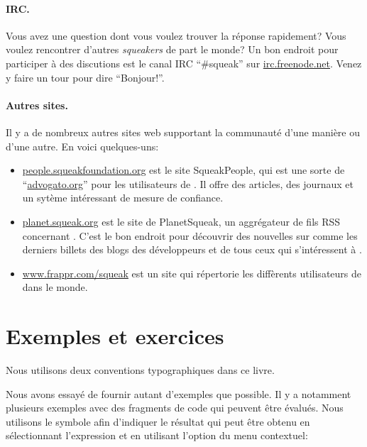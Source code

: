 \documentclass[a4paper,10pt,twoside]{book}
\begin{document}
\paragraph{IRC.}
Vous avez une question dont vous voulez trouver la r\'eponse
rapidement? Vous voulez rencontrer d'autres \emph{squeakers} de part
le monde? Un bon endroit pour participer \`a des discutions est le
canal IRC ``\#squeak'' sur \url{irc.freenode.net}. 
Venez y faire un tour pour dire ``Bonjour!''.

\paragraph{Autres sites.} Il y a de nombreux autres sites web supportant la communaut\'e \sq d'une mani\`ere ou d'une autre. En voici quelques-uns:
\begin{itemize}
  \item \url{people.squeakfoundation.org} est le site
    \textsf{SqueakPeople}, qui est une sorte de
    ``\url{advogato.org}'' pour les utilisateurs de \sq. Il offre des
    articles, des journaux et un syt\`eme int\'eressant de mesure de confiance.

  \item \url{planet.squeak.org} est le site de \textsf{PlanetSqueak},
    un aggr\'egateur de fils RSS concernant \sq. C'est le bon endroit
    pour d\'ecouvrir des nouvelles sur \sq comme les derniers billets
    des blogs des d\'eveloppeurs et de tous ceux qui s'int\'eressent \`a \sq.

  \item \url{www.frappr.com/squeak} est un site qui r\'epertorie les
    diff\`erents utilisateurs de \sq dans le monde.

\end{itemize}


\section*{Exemples et exercices}

Nous utilisons deux conventions typographiques dans ce livre.

Nous avons essay\'e de fournir autant d'exemples que possible.
Il y a notamment plusieurs exemples avec des fragments de code qui
peuvent \^etre \'evalu\'es. Nous utilisons le symbole \ct{-->} afin
d'indiquer le r\'esultat qui peut \^etre obtenu en s\'electionnant
l'expression et en utilisant l'option  du menu contextuel:
\end{document}
